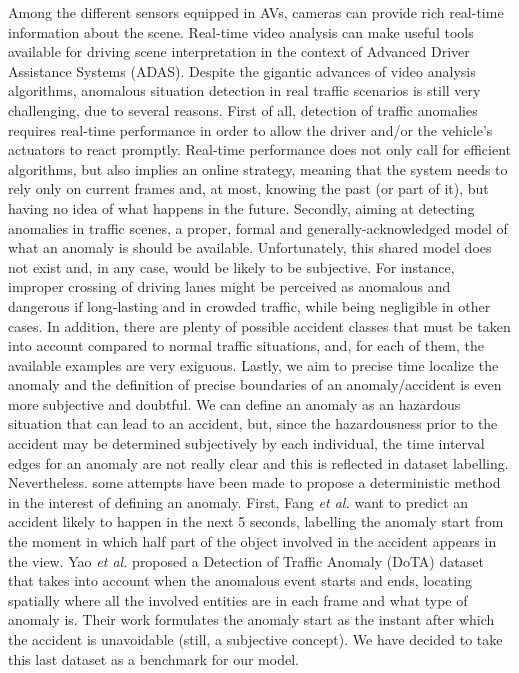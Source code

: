 Among the different sensors equipped in AVs, cameras can provide rich real-time information about the scene.
Real-time video analysis can make useful tools available for driving scene interpretation in the context of Advanced Driver Assistance Systems (ADAS).
Despite the gigantic advances of video analysis algorithms, anomalous situation detection in real traffic scenarios is still very challenging, due to several reasons.
First of all, detection of traffic anomalies requires real-time performance in order to allow the driver and/or the vehicle's actuators to react promptly.
Real-time performance does not only call for efficient algorithms, but also implies an online strategy, meaning that the system needs to rely only on current frames and, at most, knowing the past (or part of it), but having no idea of what happens in the future.
Secondly, aiming at detecting anomalies in traffic scenes, a proper, formal and generally-acknowledged model of what an anomaly is should be available.
Unfortunately, this shared model does not exist and, in any case, would be likely to be subjective.
For instance, improper crossing of driving lanes might be perceived as anomalous and dangerous if long-lasting and in crowded traffic, while being negligible in other cases.
In addition, there are plenty of possible accident classes that must be taken into account compared to normal traffic situations, and, for each of them, the available examples are very exiguous.
Lastly, we aim to precise time localize the anomaly and the definition of precise boundaries of an anomaly/accident is even more subjective and doubtful.
We can define an anomaly as an hazardous situation that can lead to an accident, but, since the hazardousness prior to the accident may be determined subjectively by each individual, the time interval edges for an anomaly are not really clear and this is reflected in dataset labelling.
Nevertheless. some attempts have been made to propose a deterministic method in the interest of defining an anomaly.
First, Fang \emph{et al.} \cite{fang2019dada} want to predict an accident likely to happen in the next 5 seconds, labelling the anomaly start from the moment in which half part of the object involved in the accident appears in the view.
Yao \emph{et al.} \cite{yao2020when} proposed a Detection of Traffic Anomaly (DoTA) dataset that takes into account when the anomalous event starts and ends, locating spatially where all the involved entities are in each frame and what type of anomaly is. Their work formulates the anomaly start as the instant after which the accident is unavoidable (still, a subjective concept).
We have decided to take this last dataset as a benchmark for our model.


